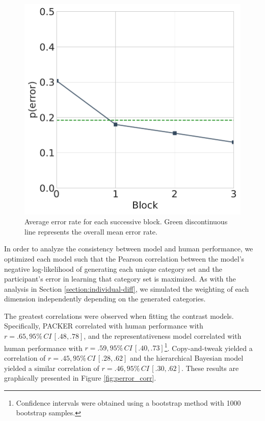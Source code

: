 \documentclass[12pt]{article}
\begin{document}
\begin{flushleft}
\begin{figure}
    \begin{center}
    \includegraphics[width=\textwidth/2]{figs/e3-learningcurve.pdf}
    \caption{Average error rate for each successive block. Green discontinuous
line represents the overall mean error rate.}
    \label{fig:learningcurve}
    \end{center}
\end{figure}

In order to analyze the consistency between model and human performance, we
optimized each model such that the Pearson correlation between the model's
negative log-likelihood of generating each unique category set and the
participant's error in learning that category set is maximized. As with the
analysis in Section \ref{section:individual-diff}, we simulated the weighting of
each dimension independently depending on the generated categories.

The greatest correlations were observed when fitting the contrast models.
Specifically, PACKER correlated with human performance with
$r = .65, 95\%\,CI\, [.48,.78]$, and the representativeness
model correlated with human performance with $r = .59, 95\%\,CI\,[.40, .73]$\footnote{Confidence intervals were obtained using a bootstrap
  method with 1000 bootstrap samples.}.
Copy-and-tweak yielded a correlation of $r = .45, 95\%\,CI\,[.28, .62]$ and the
hierarchical Bayesian model yielded a similar correlation of
$r = .46, 95\%\,CI\, [.30, .62]$. These results are graphically presented in Figure
\ref{fig:perror_corr}.


\end{flushleft}
\end{document}
